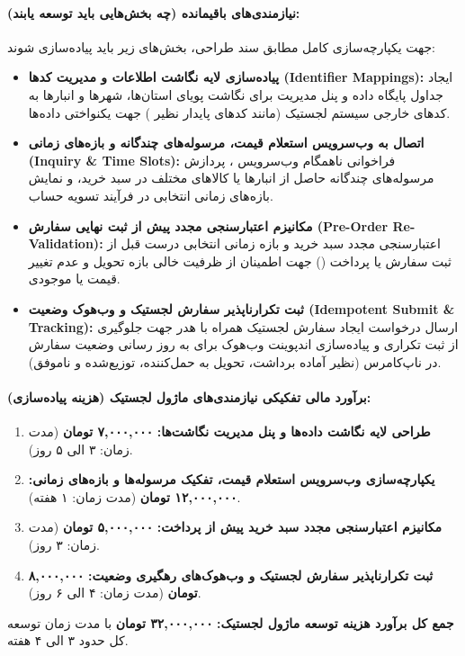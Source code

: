 \documentclass[11pt,a4paper]{article}
\begin{document}
\paragraph{نیازمندی‌های باقیمانده (چه بخش‌هایی باید توسعه یابند):}
جهت یکپارچه‌سازی کامل مطابق سند طراحی، بخش‌های زیر باید پیاده‌سازی شوند:
\begin{itemize}
    \item \textbf{پیاده‌سازی لایه نگاشت اطلاعات و مدیریت کدها (Identifier Mappings):} ایجاد جداول پایگاه داده و پنل مدیریت برای نگاشت پویای استان‌ها، شهرها و انبارها به کدهای خارجی سیستم لجستیک (مانند کدهای پایدار  نظیر ) جهت یکنواختی داده‌ها.
    \item \textbf{اتصال به وب‌سرویس استعلام قیمت، مرسوله‌های چندگانه و بازه‌های زمانی (Inquiry \& Time Slots):} فراخوانی ناهمگام وب‌سرویس ، پردازش مرسوله‌های چندگانه حاصل از انبارها یا کالاهای مختلف در سبد خرید، و نمایش بازه‌های زمانی انتخابی در فرآیند تسویه حساب.
    \item \textbf{مکانیزم اعتبارسنجی مجدد پیش از ثبت نهایی سفارش (Pre-Order Re-Validation):} اعتبارسنجی مجدد سبد خرید و بازه زمانی انتخابی درست قبل از ثبت سفارش یا پرداخت () جهت اطمینان از ظرفیت خالی بازه تحویل و عدم تغییر قیمت یا موجودی.
    \item \textbf{ثبت تکرارناپذیر سفارش لجستیک و وب‌هوک وضعیت (Idempotent Submit \& Tracking):} ارسال درخواست ایجاد سفارش لجستیک همراه با هدر  جهت جلوگیری از ثبت تکراری و پیاده‌سازی اندپوینت وب‌هوک برای به روز رسانی وضعیت سفارش در ناپ‌کامرس (نظیر آماده برداشت، تحویل به حمل‌کننده، توزیع‌شده و ناموفق).
\end{itemize}

\paragraph{برآورد مالی تفکیکی نیازمندی‌های ماژول لجستیک (هزینه پیاده‌سازی):}
\begin{enumerate}
    \item \textbf{طراحی لایه نگاشت داده‌ها و پنل مدیریت نگاشت‌ها:} \textbf{۷,۰۰۰,۰۰۰ تومان} (مدت زمان: ۳ الی ۵ روز).
    \item \textbf{یکپارچه‌سازی وب‌سرویس استعلام قیمت، تفکیک مرسوله‌ها و بازه‌های زمانی:} \textbf{۱۲,۰۰۰,۰۰۰ تومان} (مدت زمان: ۱ هفته).
    \item \textbf{مکانیزم اعتبارسنجی مجدد سبد خرید پیش از پرداخت:} \textbf{۵,۰۰۰,۰۰۰ تومان} (مدت زمان: ۳ روز).
    \item \textbf{ثبت تکرارناپذیر سفارش لجستیک و وب‌هوک‌های رهگیری وضعیت:} \textbf{۸,۰۰۰,۰۰۰ تومان} (مدت زمان: ۴ الی ۶ روز).
\end{enumerate}
\textbf{جمع کل برآورد هزینه توسعه ماژول لجستیک:} \textbf{۳۲,۰۰۰,۰۰۰ تومان} با مدت زمان توسعه کل حدود ۳ الی ۴ هفته.
\end{document}
